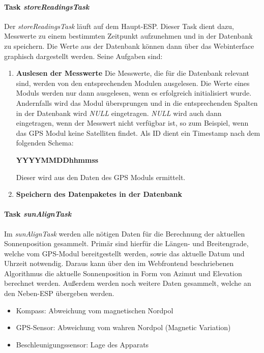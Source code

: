 \paragraph{Task \textit{storeReadingsTask}}
Der \textit{storeReadingsTask} läuft auf dem Haupt-ESP.
Dieser Task dient dazu, Messwerte zu einem bestimmten Zeitpunkt aufzunehmen und in der Datenbank zu speichern.
Die Werte aus der Datenbank können dann über das Webinterface graphisch dargestellt werden.
Seine Aufgaben sind:
\begin{enumerate}
    \item \textbf{Auslesen der Messwerte}
          Die Messwerte, die für die Datenbank relevant sind, werden von den entsprechenden Modulen ausgelesen.
          Die Werte eines Moduls werden nur dann ausgelesen, wenn es erfolgreich initialisiert wurde.
          Andernfalls wird das Modul übersprungen und in die entsprechenden Spalten in der Datenbank wird \emph{NULL} eingetragen.
          \emph{NULL} wird auch dann eingetragen, wenn der Messwert nicht verfügbar ist, so zum Beispiel, wenn das GPS Modul keine Satelliten findet.
          Als ID dient ein Timestamp nach dem folgenden Schema:
          \begin{center}
              \textbf{YYYYMMDDhhmmss}
          \end{center}
          Dieser wird aus den Daten des GPS Moduls ermittelt.
    \item \textbf{Speichern des Datenpaketes in der Datenbank}
\end{enumerate}

\paragraph{Task \textit{sunAlignTask}}
Im \textit{sunAlignTask} werden alle nötigen Daten für die Berechnung der aktuellen Sonnenposition gesammelt.
Primär sind hierfür die Längen- und Breitengrade, welche vom GPS-Modul bereitgestellt werden, sowie das aktuelle Datum und Uhrzeit notwendig.
Daraus kann über den im Webfrontend beschriebenen Algorithmus die aktuelle Sonnenposition in Form von Azimut und Elevation berechnet werden.
\newline
Außerdem werden noch weitere Daten gesammelt, welche an den Neben-ESP übergeben werden.
\begin{itemize}
    \item Kompass: Abweichung vom magnetischen Nordpol
    \item GPS-Sensor: Abweichung vom wahren Nordpol (Magnetic Variation)
    \item Beschleunigungssensor: Lage des Apparats
\end{itemize}

